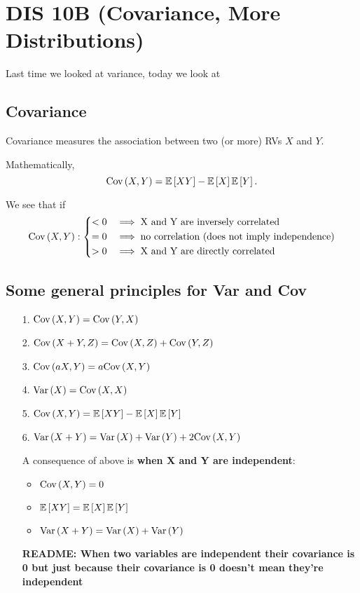 \section{DIS 10B (Covariance, More Distributions)}

Last time we looked at variance, today we look at 

\subsection{Covariance}
Covariance measures the association between two (or more) RVs $X$ and $Y$. 

Mathematically, \[ \text{Cov}\left( X,Y \right) = \mathbb{E}\left[ XY \right] - \mathbb{E}\left[ X \right]\mathbb{E}\left[ Y \right]. \]

We see that if \[ \text{Cov}\left( X,Y \right): \begin{dcases}
     < 0 & \implies \text{X and Y are inversely correlated} \\
     = 0 & \implies \text{no correlation (does not imply independence)} \\
     > 0 & \implies \text{X and Y are directly correlated} \\
\end{dcases} \]

\subsection{Some general principles for Var and Cov}
\begin{itemize}
    \item[1.] $\text{Cov}\left( X,Y \right) = \text{Cov}\left( Y,X \right)$ 
    \item[2.] $\text{Cov}\left( X+Y,Z \right) = \text{Cov}\left( X,Z \right) + \text{Cov}\left( Y,Z \right)$
    \item[3.] $\text{Cov}\left( aX, Y \right) = a\text{Cov}\left( X,Y \right)$ 
    \item[4.] $\text{Var}\left( X \right) = \text{Cov}\left( X,X \right)$ 
    \item[5.] $\text{Cov}\left( X,Y \right) = \mathbb{E}\left[ XY \right] - \mathbb{E}\left[ X \right]\mathbb{E}\left[ Y \right]$
    \item[6.] $\text{Var}\left( X+Y \right) = \text{Var}\left( X \right) + \text{Var}\left( Y \right) + 2\text{Cov}\left( X,Y \right)$
    
    \vspace{5mm}

    A consequence of above is \textbf{when X and Y are independent}:
    \begin{itemize}
        \item $\text{Cov}\left( X,Y \right) = 0$
        \item $\mathbb{E}\left[ XY \right] = \mathbb{E}\left[ X \right] \mathbb{E}\left[ Y \right]$
        \item $\text{Var}\left( X+Y \right) = \text{Var}\left( X \right) + \text{Var}\left( Y \right)$
    \end{itemize}

    \textbf{README: When two variables are independent their covariance is 0 but just because their covariance is 0 doesn't mean they're independent} 
\end{itemize}

